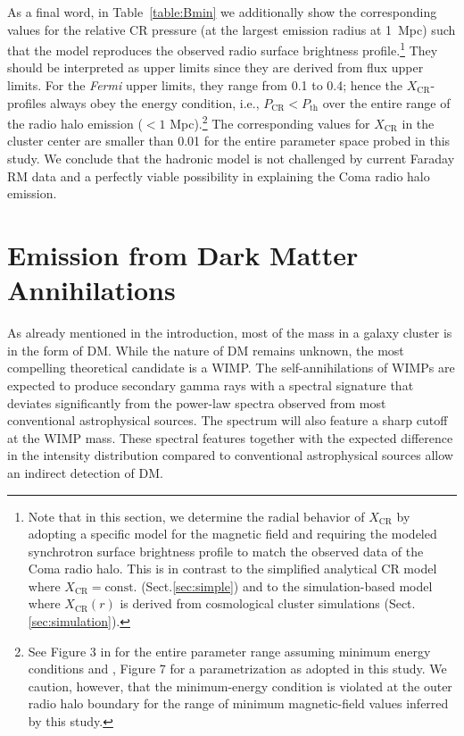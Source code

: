 \documentclass[12pt,manuscript]{aastex}
\newcommand{\rmn}{\mathrm}
\newcommand{\CR}{\mathrm{CR}}
\begin{document}
As a final word, in Table~\ref{table:Bmin} we additionally show the corresponding values for the
relative CR pressure (at the largest emission radius at 1~Mpc) such that the model reproduces the
observed radio surface brightness profile.\footnote{Note that in this section, we determine the
  radial behavior of $X_\CR$ by adopting a specific model for the magnetic field and requiring the
  modeled synchrotron surface brightness profile to match the observed data of the Coma radio
  halo. This is in contrast to the simplified analytical CR model where $X_\CR=\rmn{const.}$
  (Sect.\ref{sec:simple}) and to the simulation-based model where $X_\CR(r)$ is derived from
  cosmological cluster simulations (Sect.\ref{sec:simulation}).} They should be interpreted as upper
limits since they are derived from flux upper limits. For the {\em Fermi} upper limits, they range
from 0.1 to 0.4; hence the $X_{\CR}$-profiles always obey the energy condition, i.e., $P_{\CR} <
P_{\mathrm{th}}$ over the entire range of the radio halo emission ($< 1$ Mpc).\footnote{See Figure 3
  in \citet{article:PfrommerEnsslin:2004a} for the entire parameter range assuming minimum energy
  conditions and \citet{article:PfrommerEnsslin:2004b}, Figure 7 for a parametrization as adopted in
  this study.  We caution, however, that the minimum-energy condition is violated at the outer radio
  halo boundary for the range of minimum magnetic-field values inferred by this study.} The
corresponding values for $X_\CR$ in the cluster center are smaller than 0.01 for the entire
parameter space probed in this study. We conclude that the hadronic model is not challenged by
current Faraday RM data and a perfectly viable possibility in explaining the Coma radio halo
emission.

%
%

\section{Emission from Dark Matter Annihilations}
As already mentioned in the introduction, most of the mass in a galaxy cluster is in the form of
DM. While the nature of DM remains unknown, the most compelling theoretical candidate is a
WIMP. The self-annihilations of WIMPs are expected to produce secondary gamma rays with a
spectral signature that deviates significantly from the power-law spectra observed from most
conventional astrophysical sources. The spectrum will also feature a sharp cutoff at the WIMP
mass. These spectral features together with the expected difference in the
intensity distribution compared to conventional astrophysical sources allow an
indirect detection of DM.
\end{document}
